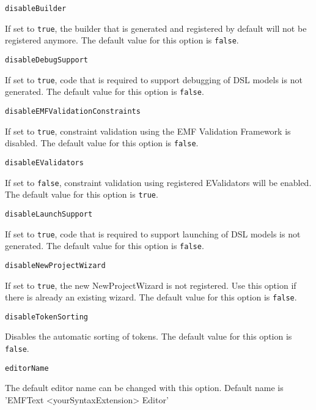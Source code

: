 \noindent\texttt{disableBuilder}
\begin{myindentpar}{1cm}
If set to \texttt{true}, the builder that is generated and registered by default will not be registered anymore. The default value for this option is \texttt{false}.
\end{myindentpar}

\noindent\texttt{disableDebugSupport}
\begin{myindentpar}{1cm}
If set to \texttt{true}, code that is required to support debugging of DSL models is not generated. The default value for this option is \texttt{false}.
\end{myindentpar}

\noindent\texttt{disableEMFValidationConstraints}
\begin{myindentpar}{1cm}
If set to \texttt{true}, constraint validation using the EMF Validation Framework is disabled. The default value for this option is \texttt{false}.
\end{myindentpar}

\noindent\texttt{disableEValidators}
\begin{myindentpar}{1cm}
If set to \texttt{false}, constraint validation using registered EValidators will be enabled. The default value for this option is \texttt{true}.
\end{myindentpar}

\noindent\texttt{disableLaunchSupport}
\begin{myindentpar}{1cm}
If set to \texttt{true}, code that is required to support launching of DSL models is not generated. The default value for this option is \texttt{false}.
\end{myindentpar}

\noindent\texttt{disableNewProjectWizard}
\begin{myindentpar}{1cm}
If set to \texttt{true}, the new NewProjectWizard is not registered. Use this option if there is already an existing wizard. The default value for this option is \texttt{false}.
\end{myindentpar}

\noindent\texttt{disableTokenSorting}
\begin{myindentpar}{1cm}
Disables the automatic sorting of tokens. The default value for this option is \texttt{false}.
\end{myindentpar}

\noindent\texttt{editorName}
\begin{myindentpar}{1cm}
The default editor name can be changed with this option. Default name is 'EMFText <yourSyntaxExtension> Editor'
\end{myindentpar}

